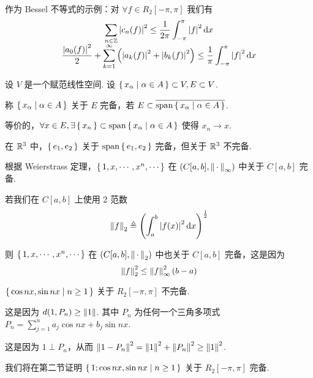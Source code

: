 作为 Bessel 不等式的示例：对 $\forall f\in R_2[-\pi,\pi]$ 我们有
$$
\begin{array}{c}
    \displaystyle\sum_{n\in\mathbb{Z}}\left\lvert{c_n(f)}\right\rvert^2\le\frac{1}{2\pi}\int_{-\pi}^\pi\left\lvert{f}\right\rvert^2\mathrm{d} x\\
    \displaystyle\frac{\left\lvert{a_0(f)}\right\rvert^2}{2}+\sum_{k=1}^\infty\left(\left\lvert{a_k(f)}\right\rvert^2+\left\lvert{b_k(f)}\right\rvert^2\right)\le\frac{1}{\pi}\int_{-\pi}^\pi\left\lvert{f}\right\rvert^2\mathrm{d} x
\end{array}
$$


\begin{definition}
    设 $V$ 是一个赋范线性空间. 设 $\set{x_\alpha|\alpha\in A}\subset V,E\subset V$.

    称 $\set{x_\alpha|\alpha\in A}$ 关于 $E$ 完备，若 $E\subset\overline{\mathrm{span}\set{x_\alpha|\alpha\in A}}$.

    等价的，$\forall x\in E,\exists\set{x_n}\subset\mathrm{span}\set{x_\alpha|\alpha\in A}$ 使得 $x_n\to x$.
\end{definition}

\begin{example}
    在 $\mathbb{R}^3$ 中，$\set{e_1,e_2}$ 关于 $\mathrm{span}\set{e_1,e_2}$ 完备，但关于 $\mathbb{R}^3$ 不完备.
\end{example}

\begin{example}
    根据 Weierstrass 定理，$\set{1,x,\cdots,x^n,\cdots}$ 在 $(C[a,b],\left\lVert{\,\cdot\,}\right\rVert_\infty)$ 中关于 $C[a,b]$ 完备.
\end{example}

\begin{hint}
    若我们在 $C[a,b]$ 上使用 2 范数
$$
\left\lVert{f}\right\rVert_2\triangleq\left(\int_a^b\left\lvert{f(x)}\right\rvert^2\mathrm{d} x\right)^\frac{1}{2}
$$

    则 $\set{1,x,\cdots,x^n,\cdots}$ 在 $(C[a,b],\left\lVert{\,\cdot\,}\right\rVert_2)$ 中也关于 $C[a,b]$ 完备，这是因为
$$
\left\lVert{f}\right\rVert_2^2\le\left\lVert{f}\right\rVert_\infty^2(b-a)
$$
\end{hint}

\begin{example}
    $\set{\cos nx,\sin nx|n\ge 1}$ 关于 $R_2[-\pi,\pi]$ 不完备.

    这是因为 $d(1,P_n)\ge\left\lVert{1}\right\rVert$. 其中 $P_n$ 为任何一个三角多项式 $P_n=\sum\limits_{j=1}^na_j\cos nx+b_j\sin nx$.

    这是因为 $1\perp P_n$，从而 $\left\lVert{1-P_n}\right\rVert^2=\left\lVert{1}\right\rVert^2+\left\lVert{P_n}\right\rVert^2\ge\left\lVert{1}\right\rVert^2$.
\end{example}

\begin{hint}
    我们将在第二节证明 $\set{1;\cos nx,\sin nx|n\ge 1}$ 关于 $R_2[-\pi,\pi]$ 完备.
\end{hint}

